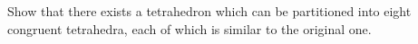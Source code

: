 Show that there exists a tetrahedron which can be partitioned into eight congruent tetrahedra, each of which is similar to the original one.